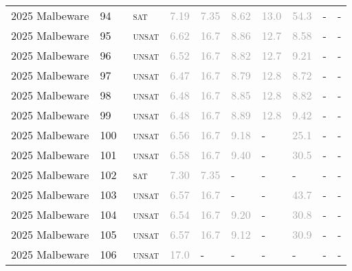 \begin{center}
{\begin{longtable}{@{}llllllllll@{}}
2025 Malbeware & 94 & ~\textsc{sat} & \textcolor{darkgray}{7.19} & \textcolor{darkgray}{7.35} & \textcolor{darkgray}{8.62} & \textcolor{darkgray}{13.0} & \textcolor{darkgray}{54.3} & - & - \\
2025 Malbeware & 95 & ~\textsc{unsat} & \textcolor{darkgray}{6.62} & \textcolor{darkgray}{16.7} & \textcolor{darkgray}{8.86} & \textcolor{darkgray}{12.7} & \textcolor{darkgray}{8.58} & - & - \\
2025 Malbeware & 96 & ~\textsc{unsat} & \textcolor{darkgray}{6.52} & \textcolor{darkgray}{16.7} & \textcolor{darkgray}{8.82} & \textcolor{darkgray}{12.7} & \textcolor{darkgray}{9.21} & - & - \\
2025 Malbeware & 97 & ~\textsc{unsat} & \textcolor{darkgray}{6.47} & \textcolor{darkgray}{16.7} & \textcolor{darkgray}{8.79} & \textcolor{darkgray}{12.8} & \textcolor{darkgray}{8.72} & - & - \\
2025 Malbeware & 98 & ~\textsc{unsat} & \textcolor{darkgray}{6.48} & \textcolor{darkgray}{16.7} & \textcolor{darkgray}{8.85} & \textcolor{darkgray}{12.8} & \textcolor{darkgray}{8.82} & - & - \\
2025 Malbeware & 99 & ~\textsc{unsat} & \textcolor{darkgray}{6.48} & \textcolor{darkgray}{16.7} & \textcolor{darkgray}{8.89} & \textcolor{darkgray}{12.8} & \textcolor{darkgray}{9.42} & - & - \\
2025 Malbeware & 100 & ~\textsc{unsat} & \textcolor{darkgray}{6.56} & \textcolor{darkgray}{16.7} & \textcolor{darkgray}{9.18} & - & \textcolor{darkgray}{25.1} & - & - \\
2025 Malbeware & 101 & ~\textsc{unsat} & \textcolor{darkgray}{6.58} & \textcolor{darkgray}{16.7} & \textcolor{darkgray}{9.40} & - & \textcolor{darkgray}{30.5} & - & - \\
2025 Malbeware & 102 & ~\textsc{sat} & \textcolor{darkgray}{7.30} & \textcolor{darkgray}{7.35} & - & - & - & - & - \\
2025 Malbeware & 103 & ~\textsc{unsat} & \textcolor{darkgray}{6.57} & \textcolor{darkgray}{16.7} & - & - & \textcolor{darkgray}{43.7} & - & - \\
2025 Malbeware & 104 & ~\textsc{unsat} & \textcolor{darkgray}{6.54} & \textcolor{darkgray}{16.7} & \textcolor{darkgray}{9.20} & - & \textcolor{darkgray}{30.8} & - & - \\
2025 Malbeware & 105 & ~\textsc{unsat} & \textcolor{darkgray}{6.57} & \textcolor{darkgray}{16.7} & \textcolor{darkgray}{9.12} & - & \textcolor{darkgray}{30.9} & - & - \\
2025 Malbeware & 106 & ~\textsc{unsat} & \textcolor{darkgray}{17.0} & - & - & - & - & - & - \\

\end{longtable}}
\end{center}
